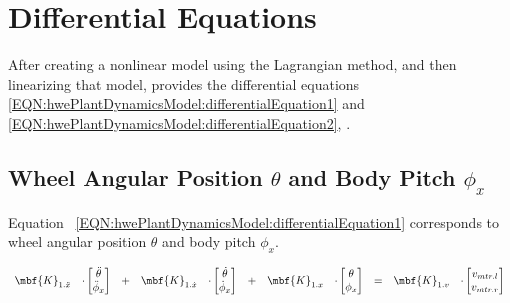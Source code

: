 \documentclass[crop=false,float=true,class=scrreprt]{standalone}
\begin{document}
\section{Differential Equations}
\label{SEC:hwePlantDynamicsModel:differentialEquations}

After creating a nonlinear model using the Lagrangian method, 
and then linearizing that model,
\textcite{REF:online:2009-yamamoto}
provides the differential equations
\eqref{EQN:hwePlantDynamicsModel:differentialEquation1}
and 
\eqref{EQN:hwePlantDynamicsModel:differentialEquation2},
{}.




\subsection{Wheel Angular Position $\theta$ and Body Pitch $\phi_{x}$}
\label{SEC:hwePlantDynamicsModel:differentialEquations:thetaPhiX}

Equation~%
\eqref{EQN:hwePlantDynamicsModel:differentialEquation1}
corresponds to wheel angular position $\theta$ and body pitch $\phi_{x}$.




\vspace{-1em}


\begin{equation}
\label{EQN:hwePlantDynamicsModel:differentialEquation1}
\begin{array}{ccccccccccc}
\mbf{K}_{1.\ddot{x}}
& \cdot 
\begin{bmatrix}
\ddot{\theta}  \\
\ddot{\phi}_{x}\\
\end{bmatrix}
& + &
\mbf{K}_{1.\dot{x}}
& \cdot 
\begin{bmatrix}
\dot{\theta}  \\
\dot{\phi}_{x}\\
\end{bmatrix}
& + &
\mbf{K}_{1.x}
& \cdot 
\begin{bmatrix}
\theta  \\
\phi_{x}\\
\end{bmatrix}
& = &
\mbf{K}_{1.v}
& \cdot
\begin{bmatrix}
v_{mtr.l}\\
v_{mtr.r}\\
\end{bmatrix}
\end{array}
\end{equation}
\end{document}
